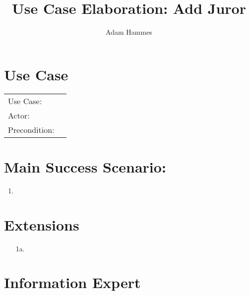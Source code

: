 \documentclass{article}
\title{Use Case Elaboration: Add Juror}
\author{Adam Hammes}
\begin{document}
\maketitle

\section*{Use Case}
\begin{tabular}{l l}
  Use Case:     & \\
  Actor:        & \\
  Precondition: & \\
\end{tabular}

\section*{Main Success Scenario:}
\begin{enumerate}
  \item 
\end{enumerate}

\section*{Extensions}
\begin{itemize}
  \item [1a.]

\end{itemize}

\section*{Information Expert}
\end{document}
